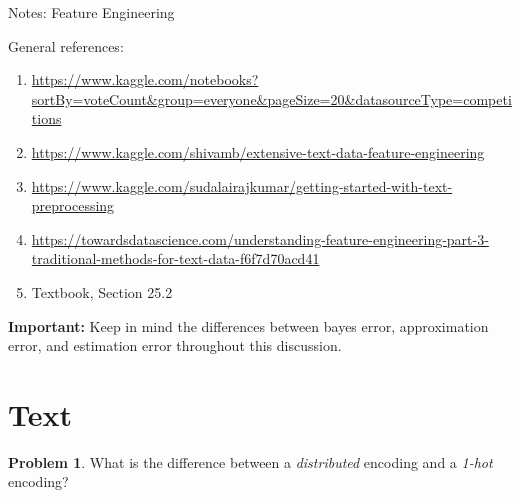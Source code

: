 \documentclass[10pt]{article}
\theoremstyle{definition}
\newtheorem{problem}{Problem}
\begin{document}
\begin{center}
\Huge
Notes: Feature Engineering
\end{center}


\noindent
General references:

\begin{enumerate}
    \item \url{https://www.kaggle.com/notebooks?sortBy=voteCount&group=everyone&pageSize=20&datasourceType=competitions}
    \item \url{https://www.kaggle.com/shivamb/extensive-text-data-feature-engineering}
    \item \url{https://www.kaggle.com/sudalairajkumar/getting-started-with-text-preprocessing}
    \item \url{https://towardsdatascience.com/understanding-feature-engineering-part-3-traditional-methods-for-text-data-f6f7d70acd41}
    \item Textbook, Section 25.2
\end{enumerate}

\noindent
\textbf{Important:}
Keep in mind the differences between bayes error, approximation error, and estimation error throughout this discussion.


\section{Text}
\begin{problem}
    What is the difference between a \emph{distributed} encoding and a \emph{1-hot} encoding?
\end{problem}
\end{document}
